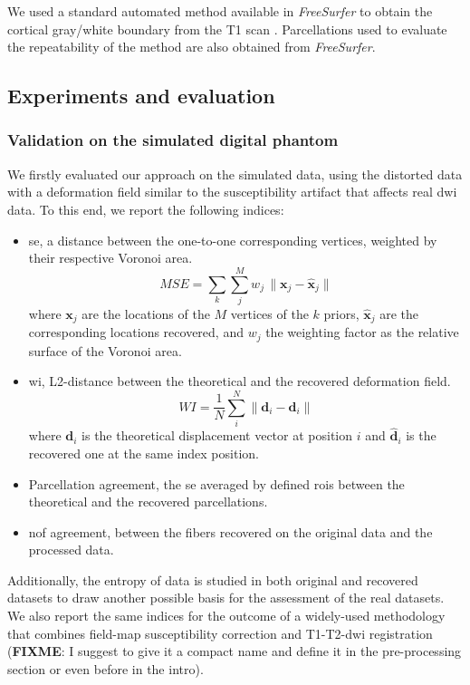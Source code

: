 We used a standard automated method 
available in \emph{FreeSurfer} \citep{fischl_freesurfer_2012} to obtain the
cortical gray/white boundary from the T1 scan \citep{greve_accurate_2009}.
Parcellations used to evaluate the repeatability of the method are also
obtained from \emph{FreeSurfer}.


\subsection{Experiments and evaluation}
\label{sec:experiments_evaluation}
%
\subsubsection{Validation on the simulated digital phantom} %
\label{sec:validation_phantom}
We firstly evaluated our approach on the simulated data, using
the distorted data with a deformation field similar to the
susceptibility artifact that affects real \gls{dwi} data. To 
this end, we report the following indices:
\begin{itemize}
\item \gls{se}, a distance between the one-to-one corresponding
vertices, weighted by their respective Voronoi area.
\begin{equation}
MSE = \sum\limits_k \sum\limits_j^M w_j\,\| \mathbf{x}_j - \hat{\mathbf{x}}_j \|
\end{equation}
where $\mathbf{x}_j$ are the locations of the $M$ vertices of the $k$ priors,
$\hat{\mathbf{x}}_j$ are the corresponding locations recovered, and $w_j$ the
weighting factor as the relative surface of the Voronoi area.
\item \gls{wi}, L2-distance between the theoretical and the recovered
deformation field.
\begin{equation}
WI = \frac{1}{N} \sum\limits_i^N \| \mathbf{d}_i - \hat{\mathbf{d}}_i \|
\end{equation}
where $\mathbf{d}_i$ is the theoretical displacement vector at position $i$
and $\hat{\mathbf{d}}_i$ is the recovered one at the same index position.
\item Parcellation agreement, the \gls{se} averaged by defined \glspl{roi}
between the theoretical and the recovered parcellations.
\item \gls{nof} agreement, between the fibers recovered on the original
data and the processed data.
\end{itemize}

Additionally, the entropy of data is studied in both
original and recovered datasets to draw another possible basis for the 
assessment of the real datasets. We also report the same indices for the
outcome of a widely-used methodology that combines field-map susceptibility 
correction and T1-T2-\gls{dwi} registration (\textbf{FIXME}: I suggest to give 
it a compact name and define it in the pre-processing section or even before
in the intro).

